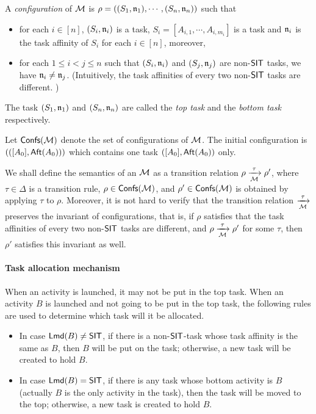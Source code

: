 A \emph{configuration} of ${\mathcal{M} }$ is $\rho = ((S_1,\mathfrak{n}_1), \cdots, (S_n,\mathfrak{n}_n))$ such that
\begin{itemize}
\item for each $i \in [n]$, $(S_i,\mathfrak{n}_i)$ is a task, $S_i = [A_{i,1}, \cdots, A_{i, m_i}]$ is a task and $\mathfrak{n}_i$ is the task affinity of $S_i$ for each $i \in [n]$, moreover, 
%
\item for each $1 \le i < j \le n$ such that $(S_i, \mathfrak{n}_i)$ and $(S_j, \mathfrak{n}_j)$ are non-$\mathsf{SIT}$ tasks,  we have $ \mathfrak{n}_i \neq \mathfrak{n}_j$.  (Intuitively, the task affinities of every two non-$\mathsf{SIT}$ tasks are different. )
\end{itemize}
The task $(S_1,\mathfrak{n}_1)$ and $(S_n,\mathfrak{n}_n)$ are called the \emph{top task} and the \emph{bottom task} respectively. 


Let ${\mathsf{Confs} }({\mathcal{M} })$ denote the set of configurations of ${\mathcal{M} }$.
The initial configuration is $(([A_0],{\sf Aft}(A_0)))$ which contains one task $([A_0], {\sf Aft}(A_0))$ only. 

We shall define the semantics of an {\AMASS} ${\mathcal{M} }$ as a transition relation $\rho \xrightarrow[{\mathcal{M} }]{\tau} \rho'$, where $\tau \in \Delta$ is a transition rule, $\rho \in {\mathsf{Confs} }({\mathcal{M} })$, and $\rho' \in {\mathsf{Confs} }({\mathcal{M} })$ is obtained by applying $\tau$ to $\rho$. Moreover, it is not hard to verify that the transition relation $\xrightarrow[{\mathcal{M} }]{\tau}$ preserves the invariant of configurations, that is, if $\rho$ satisfies that the task affinities of every two non-${\sf SIT}$ tasks are different, and $\rho \xrightarrow[{\mathcal{M} }]{\tau} \rho'$ for some $\tau$, then $\rho'$ satisfies this invariant as well. 

\paragraph{Task allocation mechanism} 
When an activity is launched, it may not be put in the top task. 
When an activity $B$ is launched and not going to be put in the top task, the following rules are used to determine which task will it be allocated. 
\begin{itemize}
	\item In case ${\sf Lmd}(B) \neq \mathsf{SIT}$, if there is a non-$\mathsf{SIT}$-task whose task affinity is the same as $B$, then $B$ will be put on the task; otherwise, a new task will be created to hold $B$.
 
	\item In case ${\sf Lmd}(B) = \mathsf{SIT}$,    if there is any task whose bottom activity is $B$ (actually $B$ is the only activity in the task), then the task will be moved to the top; otherwise, a new task is created to hold $B$.
\end{itemize}


